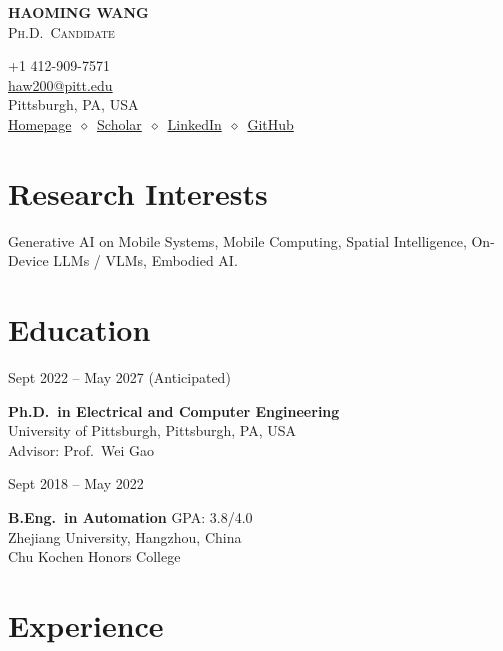 \documentclass[11pt, letterpaper]{article}
\newenvironment{datedentry}[1]{%
  \par\noindent
  \begin{minipage}[t]{2.8cm}\raggedright\small #1\end{minipage}%
  \hspace{0.3cm}%
  \begin{minipage}[t]{\dimexpr\linewidth-3.1cm\relax}\raggedright
}{%
  \end{minipage}\par\medskip
}
\begin{document}
\noindent
\begin{minipage}[t]{0.58\linewidth}
  \vspace{0pt}
  {\fontsize{24pt}{26pt}\selectfont \textbf{HAOMING WANG}}\\[2pt]
  {\scshape\normalsize Ph.D.\ Candidate}
\end{minipage}%
\begin{minipage}[t]{0.42\linewidth}
  \vspace{0pt}
  \raggedleft\small
  +1 412-909-7571 \\
  \href{mailto:haw200@pitt.edu}{haw200@pitt.edu} \\
  Pittsburgh, PA, USA \\[2pt]
  \href{https://haomingwang645.github.io/}{Homepage}\ $\diamond$\ \href{https://scholar.google.com.hk/citations?user=bf6LCjUAAAAJ}{Scholar}\ $\diamond$\ \href{https://www.linkedin.com/in/haoming-wang-40a6a7239/}{LinkedIn}\ $\diamond$\ \href{https://github.com/HaomingWang645}{GitHub}
\end{minipage}

\section{Research Interests}
Generative AI on Mobile Systems, Mobile Computing, Spatial Intelligence, On-Device LLMs / VLMs, Embodied AI.

\section{Education}

\begin{datedentry}{Sept 2022 -- May 2027 (Anticipated)}
\textbf{Ph.D.\ in Electrical and Computer Engineering}\\
University of Pittsburgh, Pittsburgh, PA, USA\\
Advisor: Prof.\ Wei Gao
\end{datedentry}

\begin{datedentry}{Sept 2018 -- May 2022}
\textbf{B.Eng.\ in Automation} \hfill GPA: 3.8/4.0\\
Zhejiang University, Hangzhou, China\\
Chu Kochen Honors College
\end{datedentry}

\section{Experience}
\end{document}
